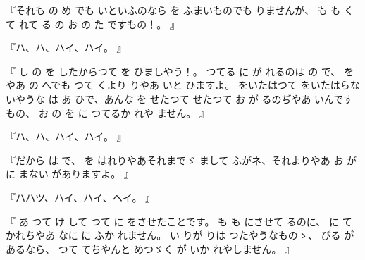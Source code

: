 『それも
の
め
でも
いといふのなら
を
ふまいものでも
りませんが、
も
も
く
て
れて
る
の
お
の
た
ですもの！。
』

『ハ、ハ、ハイ、ハイ。
』

『
し
の
を
したからつて
を
ひましやう！。
つてる
に
が
れるのは
の
で、
を
やあ
の
へでも
つて
くより
りやあ
いと
ひますよ。
をいたはつて
をいたはらないやうな
は
あ
ひで、あんな
を
せたつて
せたつて
お
が
るのぢやあ
いんですもの、
お
の
を
に
つてるか
れや
ません。
』

『ハ、ハ、ハイ、ハイ。
』

『だから
は
で、
を
はれりやあそれまでゞ
まして
ふがネ、それよりやあ
お
が
に
まない
がありますよ。
』

『ハハツ、ハイ、ハイ、ヘイ。
』

『
あ
つて
け
して
つて
に
をさせたことです。
も
も
にさせて
るのに、
に
て
かれちやあ
なに
に
ふか
れません。
い
りが
りは
つたやうなものゝ、
びる
があるなら、
つて
てちやんと
めつゞく
が
いか
れやしません。
』

